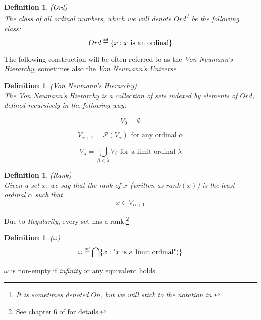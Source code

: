\documentclass[12pt,a4paper]{article}
\newtheorem{definition}[theorem]{Definition}
\newcommand{\power}[1]{\ensuremath{\mathscr{P}} (#1)}
\newcommand{\bce}{\begin{compactenum}}
\newcommand{\ece}{\end{compactenum}}
\newcommand\defeq{\mathrel{\overset{\makebox[0pt]{\mbox{\normalfont\tiny\sffamily def}}}{=}}}
\begin{document}
\begin{definition}{(Ord)}\label{def:ord}\\
\emph{The class of all ordinal numbers}, which we will denote $Ord$\footnote{It is sometimes denoted $On$, but we will stick to the notation in \cite{JechBook}} be the following class:
\begin{equation}
Ord \defeq \{x : x\mbox{ is an ordinal}\}
\end{equation}
\end{definition}

The following construction will be often referred to as the \emph{Von Neumann's Hierarchy}, sometimes also the \emph{Von Neumann's Universe}. %

\begin{definition}{(Von Neumann's Hierarchy)}\label{def:von_neumann}\\
The \emph{Von Neumann's Hierarchy} is a collection of sets indexed by elements of $Ord$, defined recursively in the following way:
\bce[(i)]
\item 
\begin{equation}
V_0 = \emptyset
\end{equation}
\item 
\begin{equation}
V_{\alpha+1} = \power{V_\alpha}\mbox{ for any ordinal $\alpha$}
\end{equation}
\item
\begin{equation} 
V_\lambda = \bigcup_{\beta < \lambda} V_\beta \mbox{ for a limit ordinal $\lambda$}
\end{equation}
\ece
\end{definition}

\begin{definition}{(Rank)}\label{def:rank}\\
Given a set $x$, we say that the rank of $x$ (written as $rank(x)$) is the least ordinal $\alpha$ such that
\begin{equation}
x \in V_{\alpha+1}
\end{equation}
\end{definition}
Due to \emph{Regularity}, every set has a rank.\footnote{See chapter 6 of \cite{JechBook} for details.}

\begin{definition}{($\omega$)}\label{def:omega}\\
\begin{equation}
\omega \defeq \bigcap\{x : \mbox{"$x$ is a limit ordinal"})\}
\end{equation}
\end{definition}
$\omega$ is non-empty if \emph{infinity} or any equivalent holds.
\end{document}
